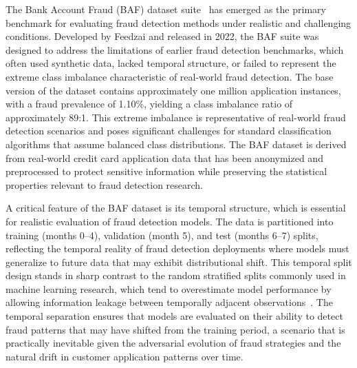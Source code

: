 The Bank Account Fraud (BAF) dataset suite~\cite{feedzai2022baf} has emerged as
the primary benchmark for evaluating fraud detection methods under realistic and
challenging conditions. Developed by Feedzai and released in 2022, the BAF suite
was designed to address the limitations of earlier fraud detection benchmarks,
which often used synthetic data, lacked temporal structure, or failed to
represent the extreme class imbalance characteristic of real-world fraud
detection. The base version of the dataset contains approximately one million
application instances, with a fraud prevalence of 1.10\%, yielding a class
imbalance ratio of approximately 89:1. This extreme imbalance is representative
of real-world fraud detection scenarios and poses significant challenges for
standard classification algorithms that assume balanced class distributions. The
BAF dataset is derived from real-world credit card application data that has
been anonymized and preprocessed to protect sensitive information while
preserving the statistical properties relevant to fraud detection research.

A critical feature of the BAF dataset is its temporal structure, which is
essential for realistic evaluation of fraud detection models. The data is
partitioned into training (months 0--4), validation (month 5), and test (months
6--7) splits, reflecting the temporal reality of fraud detection deployments
where models must generalize to future data that may exhibit distributional
shift. This temporal split design stands in sharp contrast to the random
stratified splits commonly used in machine learning research, which tend to
overestimate model performance by allowing information leakage between
temporally adjacent observations~\cite{sun2025objective}. The temporal
separation ensures that models are evaluated on their ability to detect fraud
patterns that may have shifted from the training period, a scenario that is
practically inevitable given the adversarial evolution of fraud strategies and
the natural drift in customer application patterns over time.

